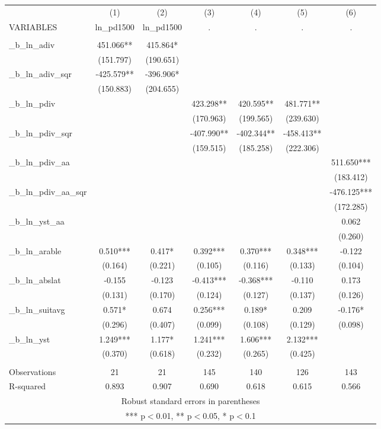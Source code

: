 \documentclass[]{article}
\begin{document}
\begin{tabular}{lcccccc} \hline
 & (1) & (2) & (3) & (4) & (5) & (6) \\
VARIABLES & ln\_pd1500 & ln\_pd1500 & . & . & . & . \\ \hline
 &  &  &  &  &  &  \\
\_b\_ln\_adiv & 451.066** & 415.864* &  &  &  &  \\
 & (151.797) & (190.651) &  &  &  &  \\
\_b\_ln\_adiv\_sqr & -425.579** & -396.906* &  &  &  &  \\
 & (150.883) & (204.655) &  &  &  &  \\
\_b\_ln\_pdiv &  &  & 423.298** & 420.595** & 481.771** &  \\
 &  &  & (170.963) & (199.565) & (239.630) &  \\
\_b\_ln\_pdiv\_sqr &  &  & -407.990** & -402.344** & -458.413** &  \\
 &  &  & (159.515) & (185.258) & (222.306) &  \\
\_b\_ln\_pdiv\_aa &  &  &  &  &  & 511.650*** \\
 &  &  &  &  &  & (183.412) \\
\_b\_ln\_pdiv\_aa\_sqr &  &  &  &  &  & -476.125*** \\
 &  &  &  &  &  & (172.285) \\
\_b\_ln\_yst\_aa &  &  &  &  &  & 0.062 \\
 &  &  &  &  &  & (0.260) \\
\_b\_ln\_arable & 0.510*** & 0.417* & 0.392*** & 0.370*** & 0.348*** & -0.122 \\
 & (0.164) & (0.221) & (0.105) & (0.116) & (0.133) & (0.104) \\
\_b\_ln\_abslat & -0.155 & -0.123 & -0.413*** & -0.368*** & -0.110 & 0.173 \\
 & (0.131) & (0.170) & (0.124) & (0.127) & (0.137) & (0.126) \\
\_b\_ln\_suitavg & 0.571* & 0.674 & 0.256*** & 0.189* & 0.209 & -0.176* \\
 & (0.296) & (0.407) & (0.099) & (0.108) & (0.129) & (0.098) \\
\_b\_ln\_yst & 1.249*** & 1.177* & 1.241*** & 1.606*** & 2.132*** &  \\
 & (0.370) & (0.618) & (0.232) & (0.265) & (0.425) &  \\
 &  &  &  &  &  &  \\
Observations & 21 & 21 & 145 & 140 & 126 & 143 \\
 R-squared & 0.893 & 0.907 & 0.690 & 0.618 & 0.615 & 0.566 \\ \hline
\multicolumn{7}{c}{ Robust standard errors in parentheses} \\
\multicolumn{7}{c}{ *** p$<$0.01, ** p$<$0.05, * p$<$0.1} \\
\end{tabular}
\end{document}
